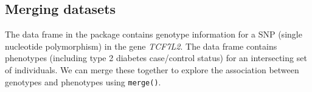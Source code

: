 %
%
%

\subsection{Merging datasets}

The  data frame in the  package contains 
genotype information for a SNP (single nucleotide polymorphism) in the gene
\emph{TCF7L2}.  
The  data frame contains phenotypes
(including type 2 diabetes case/control status) for an intersecting set of individuals.
We can merge these together to explore the association between
genotypes and phenotypes using \verb!merge()!.

